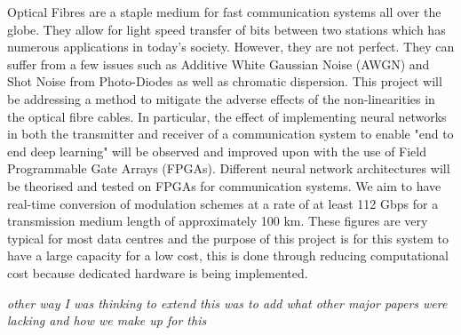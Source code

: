 
\iffalse
Think of the introduction as a development of the context for the reader.

Peruse the literature quickly. 
Highlight the historical progression of the theory and work that has been done, citing the literature as you go. 

Use the citation mechanisms in the editor you are using. 
After the reader has some idea of what the historical background is, mention what is missing in it that your proposal is going to fill.
\fi

Optical Fibres are a staple medium for fast communication systems all over the globe. They allow for light speed transfer of bits between two stations which has numerous applications in today's society. However, they are not perfect. They can suffer from a few issues such as Additive White Gaussian Noise (AWGN) and Shot Noise from Photo-Diodes as well as chromatic dispersion. This project will be addressing a method to mitigate the adverse effects of the non-linearities in the optical fibre cables. In particular, the effect of implementing neural networks in both the transmitter and receiver of a communication system to enable "end to end deep learning" will be observed and improved upon with the use of Field Programmable Gate Arrays (FPGAs). Different neural network architectures will be theorised and tested on FPGAs for communication systems. We aim to have real-time conversion of modulation schemes at a rate of at least 112 Gbps for a transmission medium length of approximately 100 km. These figures are very typical for most data centres and the purpose of this project is for this system to have a large capacity for a low cost, this is done through reducing computational cost because dedicated hardware is being implemented.

\newline \newline \textit{other way I was thinking to extend this was to add what other major papers were lacking and how we make up for this} 